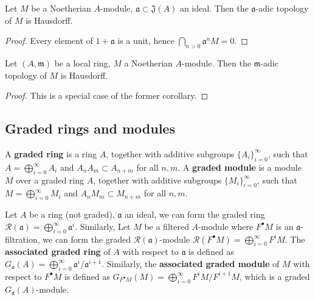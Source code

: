 \documentclass[10pt]{extarticle}
\begin{document}
\begin{corollary}{}{}
Let $M$ be a Noetherian $A$-module, $\mathfrak{a}\subset\mathfrak{J}(A)$ an ideal. Then the $\mathfrak{a}$-adic topology of $M$ is Hausdorff.
\end{corollary}
\begin{proof}
    Every element of $1+\mathfrak{a}$ is a unit, hence $\bigcap_{n>0}\mathfrak{a}^nM=0$.
\end{proof}

\begin{corollary}{}{}
    Let $(A,\mathfrak{m})$ be a local ring, $M$ a Noetherian $A$-module. Then the $\mathfrak{m}$-adic topology of $M$ is Hausdorff.
\end{corollary}
\begin{proof}
    This is a special case of the former corollary.
\end{proof}

\subsection{Graded rings and modules}
A \textbf{graded ring} is a ring $A$, together with additive subgroups $\{A_i\}_{i=0}^\infty$, such that $A=\bigoplus_{i=0}^\infty A_i$ and $A_nA_m\subset A_{n+m}$ for all $n,m$. A \textbf{graded module} is a module $M$ over a graded ring $A$, together with additive subgroups $\{M_i\}_{i=0}^\infty$, such that $M=\bigoplus_{i=0}^\infty M_i$ and $A_nM_m\subset M_{n+m}$ for all $n,m$.

Let $A$ be a ring (not graded), $\mathfrak{a}$ an ideal, we can form the graded ring $\mathcal{R}(\mathfrak{a})=\bigoplus_{i=0}^\infty \mathfrak{a}^i$. Similarly, Let $M$ be a filtered $A$-module where $F^\bullet M$ is an $\mathfrak{a}$-filtration, we can form the graded $\mathcal{R}(\mathfrak{a})$-module $\mathcal{R}(F^\bullet M)=\bigoplus_{i=0}^\infty F^iM$. The \textbf{associated graded ring} of $A$ with respect to $\mathfrak{a}$ is defined as $G_\mathfrak{a}(A)=\bigoplus_{i=0}^\infty \mathfrak{a}^i/\mathfrak{a}^{i+1}$. Similarly, the \textbf{associated graded module} of $M$ with respect to $F^\bullet M$ is defined as $G_{F^\bullet M}(M)=\bigoplus_{i=0}^\infty F^iM/F^{i+1}M$, which is a graded $G_\mathfrak{a}(A)$-module.
\end{document}
